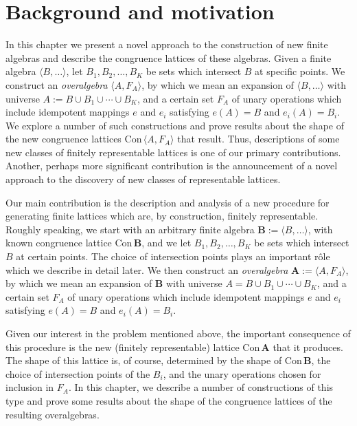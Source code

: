 \documentclass[cm,dissertation,actual,final]{uhthesis}
\theoremstyle{plain}
\theoremstyle{definition}
\theoremstyle{remark}
\numberwithin{theorem}{section}
\numberwithin{claim}{chapter}
\numberwithin{equation}{section}
\numberwithin{conjecture}{chapter}
\newcommand{\<}{\ensuremath{\langle}}
\renewcommand{\>}{\ensuremath{\rangle}}
\newcommand{\Con}{\ensuremath{\mathrm{Con\,}}}
\newcommand{\0}{\ensuremath{\mathbf{0}}}
\newcommand{\1}{\ensuremath{\mathbf{1}}}
\newcommand{\2}{\ensuremath{\mathbf{2}}}
\newcommand{\3}{\ensuremath{\mathbf{3}}}
\newcommand{\4}{\ensuremath{\mathbf{4}}}
\newcommand{\5}{\ensuremath{\mathbf{5}}}
\newcommand{\bA}{\ensuremath{\mathbf{A}}}
\newcommand{\bB}{\ensuremath{\mathbf{B}}}
\begin{document}
\section{Background and motivation}
In this chapter  we present a novel approach to the construction of new finite
algebras and describe the congruence lattices of these algebras. Given a finite
algebra $\<B, \dots\>$, let $B_1, B_2, \dots, B_K$ be sets which intersect $B$
at specific points. We construct an  {\it overalgebra} $\<A, F_A\>$, by which we
mean an expansion of $\<B, \dots\>$ with universe  $A := B \cup B_1 \cup \cdots
\cup B_K$,  and a certain set $F_A$ of unary operations which include idempotent
mappings $e$ and $e_i$ satisfying $e(A) = B$ and $e_i(A) = B_i$.  We explore a
number of such constructions and prove results about the shape of the new
congruence lattices $\Con \<A, F_A\>$ that result. Thus, descriptions of some
new classes of finitely representable lattices is one of our primary
contributions. 
Another, perhaps more significant contribution is the announcement of a
novel approach to the discovery of new classes of representable lattices.

Our main contribution is the description and analysis of a
new procedure for generating finite lattices which are, by
construction, finitely representable.  
Roughly speaking, we start with an arbitrary finite algebra $\bB := \<B,
\dots\>$, with known congruence lattice $\Con\bB$, and we let $B_1, B_2, \dots,
B_K$ be sets which intersect $B$ at certain points.  The choice of intersection
points plays an important r\^ole which we describe in detail later.  We then
construct an  {\it overalgebra} $\bA:=\<A, F_A\>$, by which we mean an expansion of $\bB$
with universe $A = B \cup B_1 \cup \cdots \cup B_K$,  and a certain set $F_A$ of
unary operations which include idempotent mappings $e$ and $e_i$
satisfying $e(A) = B$ and $e_i(A) = B_i$.  

Given our interest in the problem mentioned above, the important consequence of
this procedure is the new (finitely representable) lattice $\Con\bA$ that
it produces.  The shape of this lattice is, of course, determined by
the shape of $\Con\bB$, the choice of intersection points of the $B_i$, and the
unary operations chosen for inclusion in $F_A$.  In this chapter, we
describe a number of constructions of this type and prove some results 
about the shape of the congruence lattices of the resulting overalgebras.  
\end{document}
